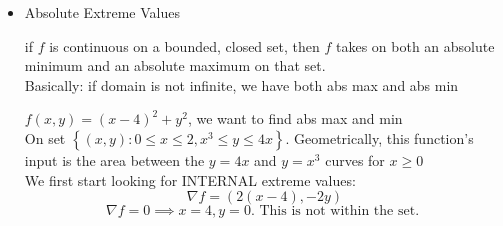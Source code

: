 \begin{itemize}
\begin{theorem}
\begin{enumerate}
				\item if $D > 0$, $A,C < 0$ $\left( x_0,y_0 \right) $ is a local maximum\\
				\item if $ D = 0$, you know nothing
			\end{enumerate}
			(question) can $D=0$?
		\end{theorem}
		\begin{example}
			$f\left( x,y \right) = xy$ 
			\[
			f_x = y, f_{xy} = 0 = A\\
			f_y = x, f_{yy} = 0 = C\\
			f_{xy} = 1 = B\\
			.\] 
			$\therefore D = AC-B^2 = -1 < 0$, therefore $\left( 0,0 \right) $ is a saddle point.
		\end{example}
		\begin{example}
			$f\left( x,y,z \right)  = 2x^2 + y^2 -xy - 7y, \nabla f = 0$ at $\left( 1,4 \right) , f\left( 1,4 \right)  = -14$ 
			\begin{align*}
				f_x &= 4x-y\\
				f_y &= 2y-x-7 \\
				f_{x x} &= 4 = A\\
				f_{yy} &= 2 = C\\
				f_{xy} &= -1 = B \\
			.\end{align*}
			$ \therefore  D = 8 - 1 = 7 > 0$ and $A = 4 > 0$ which shows it's a local minimum
		\end{example}
	\item Absolute Extreme Values\\
		\begin{theorem}
			if $f$ is continuous on a bounded, closed set, then $f$ takes on both an absolute minimum and an absolute maximum on that set.\\
			Basically: if domain is not infinite, we have both abs max and abs min
		\end{theorem}
		\begin{example}
			$f\left( x,y \right)  = \left( x-4 \right) ^2 + y^2$, we want to find abs max and min\\
			On set $\left\{ \left( x,y \right) : 0 \le  x \le  2, x^3 \le  y \le 4x \right\} $. Geometrically, this function's input is the area between the $ y = 4x$ and $y = x^3$ curves for $x \ge  0$\\
			We first start looking for INTERNAL extreme values:
			\[
			\nabla f = \left( 2\left( x-4 \right) , -2y \right) \]\[
			 \nabla f = 0 \implies x = 4, y = 0. \text{ This is not within the set. }
\]
\end{example}
\end{itemize}
